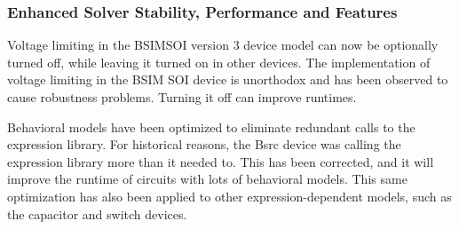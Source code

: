 \documentclass[letterpaper]{scrartcl}
\begin{document}
\subsubsection*{Enhanced Solver Stability, Performance and Features}
\begin{XyceItemize}
  \item Voltage limiting in the BSIMSOI version 3 device model can now be optionally turned off, while leaving it turned on in other devices.  The implementation of voltage limiting in the BSIM SOI device is unorthodox and has been observed to cause robustness problems.  Turning it off can improve runtimes.
  \item Behavioral models have been optimized to eliminate redundant calls to the expression library.  For historical reasons, the Bsrc device was calling the expression library more than it needed to.  This has been corrected, and it will improve the runtime of circuits with lots of behavioral models.  This same optimization has also been applied to other expression-dependent models, such as the capacitor and switch devices.
\end{XyceItemize}
\end{document}
